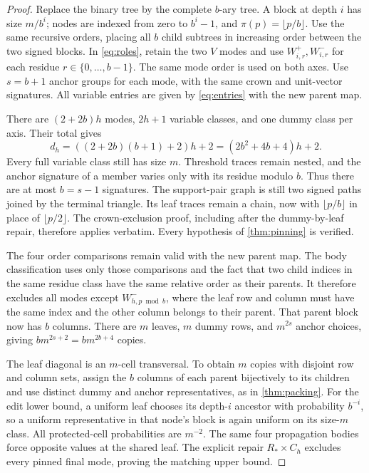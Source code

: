 \begin{proof}
Replace the binary tree by the complete \(b\)-ary tree. A block at
depth \(i\) has size \(m/b^i\); nodes are indexed from zero to
\(b^i-1\), and \(\pi(p)=\lfloor p/b\rfloor\). Use the same
recursive orders, placing all \(b\) child subtrees in increasing
order between the two signed blocks. In \eqref{eq:roles}, retain
the two \(V\) modes and use \(W_{i,r}^+,W_{i,r}^-\) for each
residue \(r\in\{0,\ldots,b-1\}\). The same mode order is used
on both axes. Use \(s=b+1\) anchor groups for each mode, with the
same crown and unit-vector signatures. All variable entries are
given by \eqref{eq:entries} with the new parent map.

There are \((2+2b)h\) modes, \(2h+1\) variable classes, and one
dummy class per axis. Their total gives
\[
 d_h=((2+2b)(b+1)+2)h+2=(2b^2+4b+4)h+2.
\]
Every full variable class still has size \(m\). Threshold traces
remain nested, and the anchor signature of a member varies only
with its residue modulo \(b\). Thus there are at most \(b=s-1\)
signatures. The support-pair graph is still two signed paths joined
by the terminal triangle. Its leaf traces remain a chain, now with
\(\lfloor p/b\rfloor\) in place of \(\lfloor p/2\rfloor\).
The crown-exclusion proof, including after the dummy-by-leaf repair,
therefore applies verbatim. Every hypothesis of \cref{thm:pinning}
is verified.

The four order comparisons remain valid with the new parent map.
The body classification uses only those comparisons and the fact
that two child indices in the same residue class have the same
relative order as their parents. It therefore excludes all modes
except \(W_{h,p\bmod b}^-\), where the leaf row and column must
have the same index and the other column belongs to their parent.
That parent block now has \(b\) columns. There are \(m\) leaves,
\(m\) dummy rows, and \(m^{2s}\) anchor choices, giving
\(b m^{2s+2}=b m^{2b+4}\) copies.

The leaf diagonal is an \(m\)-cell transversal. To obtain \(m\)
copies with disjoint row and column sets, assign the \(b\) columns
of each parent bijectively to its children and use distinct dummy
and anchor representatives, as in \cref{thm:packing}. For the edit
lower bound, a uniform leaf chooses its depth-\(i\) ancestor with
probability \(b^{-i}\), so a uniform representative in that node's
block is again uniform on its size-\(m\) class. All protected-cell
probabilities are \(m^{-2}\). The same four propagation bodies
force opposite values at the shared leaf. The explicit repair
\(R_*\times C_h\) excludes every pinned final mode, proving the
matching upper bound.


\end{proof}
